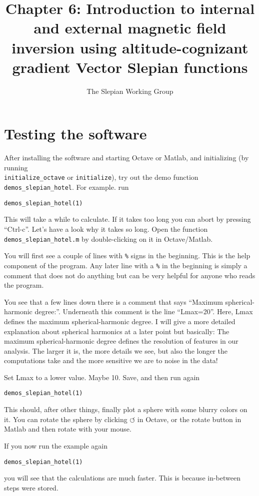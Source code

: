 \documentclass[11pt]{article}
\title{Chapter 6: Introduction to internal and external magnetic field inversion using altitude-cognizant gradient Vector Slepian functions}
\author{The Slepian Working Group}
\begin{document}
\maketitle


\section{Testing the software}

After installing the software and starting Octave or Matlab, and
initializing (by running \\
\verb+initialize_octave+ or
\verb+initialize+), try out the demo function
\verb+demos_slepian_hotel+. For example. run

\verb+demos_slepian_hotel(1)+

This will take a while to calculate. If it takes too long you can
abort by pressing ``Ctrl-c''. Let's have a look why it takes so
long. Open the function \verb+demos_slepian_hotel.m+ by double-clicking
on it in Octave/Matlab.

You will first see a couple of lines with \verb+%+ signs in the
beginning. This is the help component of the program. Any later line
with a \verb+%+ in the beginning is simply a comment that does not do
anything but can be very helpful for anyone who reads the program.

You see that a few lines down there is a comment that says ``Maximum
spherical-harmonic degree:''. Underneath this comment is the line
``Lmax=20''. Here, Lmax defines the maximum spherical-harmonic
degree. I will give a more detailed explanation about spherical
harmonics at a later point but basically: The maximum
spherical-harmonic degree defines the resolution of features in our
analysis. The larger it is, the more details we see, but also the
longer the computations take and the more sensitive we are to noise in
the data!

Set Lmax to a lower value. Maybe 10. Save, and then run again

\qquad \verb+demos_slepian_hotel(1)+

This should, after other things, finally plot a sphere with some
blurry colors on it. You can rotate the sphere by clicking $\circlearrowleft$ in
Octave, or the rotate button in Matlab and then rotate with your mouse.

If you now run the example again

\qquad \verb+demos_slepian_hotel(1)+

you will see that the calculations are much faster. This is because
in-between steps were stored.
\end{document}

